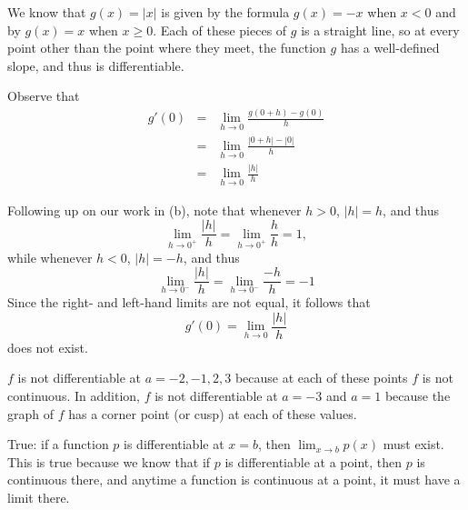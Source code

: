\begin{activitySolution}
\ba
	\item We know that $g(x) = |x|$ is given by the formula $g(x) = -x$ when $x < 0$ and by $g(x) = x$ when $x \ge 0$.  Each of these pieces of $g$ is a straight line, so at every point other than the point where they meet, the function $g$ has a well-defined slope, and thus is differentiable. 
	\item Observe that
	\begin{eqnarray*}
		g'(0) & = & \lim_{h \to 0} \frac{g(0+h)-g(0)}{h} \\
			& = & \lim_{h \to 0} \frac{|0+h|-|0|}{h} \\
			& = & \lim_{h \to 0} \frac{|h|}{h}
	\end{eqnarray*}
	\item Following up on our work in (b), note that whenever $h > 0$, $|h| = h$, and thus
	$$\lim_{h \to 0^+} \frac{|h|}{h} = \lim_{h \to 0^+} \frac{h}{h} = 1,$$
	while whenever $h < 0$, $|h| = -h$, and thus
	$$\lim_{h \to 0^-} \frac{|h|}{h} = \lim_{h \to 0^-} \frac{-h}{h} = -1$$
	Since the right- and left-hand limits are not equal, it follows that 
	$$g'(0) =  \lim_{h \to 0} \frac{|h|}{h}$$
	does not exist.

	\item $f$ is not differentiable at $a = -2, -1, 2, 3$ because at each of these points $f$ is not continuous.  In addition, $f$ is not differentiable at $a = -3$ and $a = 1$ because the graph of $f$ has a corner point (or cusp) at each of these values.  
	\item True: if a function $p$ is differentiable at $x = b$, then $\lim_{x \to b} p(x)$ must exist.  This is true because we know that if $p$ is differentiable at a point, then $p$ is continuous there, and anytime a function is continuous at a point, it must have a limit there.	
\ea
\end{activitySolution}
\aftera